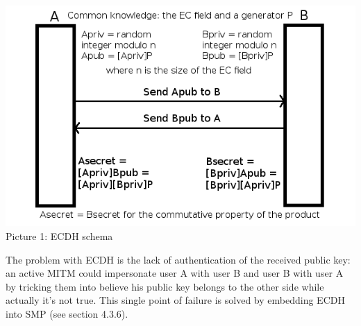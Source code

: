 \documentclass[a4paper,12pt]{article}
\begin{document}
\vspace{1cm}
\begin{center}
\includegraphics[scale=0.7]{images/ecdh}\\

\vspace{1cm}
Picture 1: ECDH schema\\
\end{center}

\vspace{1cm}
The problem with ECDH is the lack of authentication of the received public key: an active MITM could impersonate user A with user B and user B with user A by tricking them into believe his public key belongs to the other side while actually it's not true. This single point of failure is solved by embedding ECDH into SMP (see section 4.3.6).
\clearpage
\end{document}
